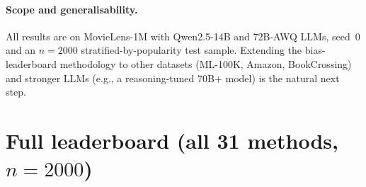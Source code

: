 \documentclass[11pt,a4paper]{article}
\begin{document}
\paragraph{Scope and generalisability.} All results are on MovieLens-1M
with Qwen2.5-14B and 72B-AWQ LLMs, seed~0 and an $n{=}2000$
stratified-by-popularity test sample. Extending the bias-leaderboard
methodology to other datasets (ML-100K, Amazon, BookCrossing) and
stronger LLMs (e.g., a reasoning-tuned 70B+ model) is the natural next
step.

\appendix
\section{Full leaderboard (all 31 methods, $n{=}2000$)}
\label{app:full_leaderboard}
\end{document}
